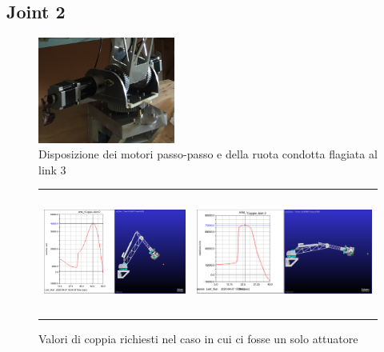 \documentclass[%
corpo=11pt,
twoside,
 stile=classica,
oldstyle,
greek,%
]{toptesi}
\begin{document}
	
	
		\subsection{Joint 2}
		\begin{figure}
			\centering
			\includegraphics[width=0.4\textwidth]{image/basefoto.png}
			\caption{Disposizione dei motori passo-passo e della ruota condotta flagiata al link 3}
			\label{fig:Stepper_foto}
		\end{figure}
		\begin{figure}[!ht]
			\centering
			\begin{tabular}{ll}
				\includegraphics[height=4cm,keepaspectratio]{Plots/SPALLA/1motore/JOINT2_conservativo.png}
				&
				\includegraphics[height=4cm,keepaspectratio]{Plots/SPALLA/1motore/JOINT2-torque.png}
			\end{tabular}
			\caption{Valori di coppia richiesti nel caso in cui ci fosse un solo attuatore}
			\label{fig:MBDJoint21motore}
		\end{figure}
\end{document}
